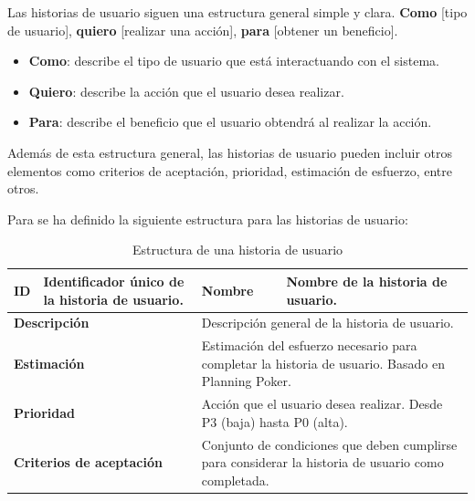Las historias de usuario siguen una estructura general simple y clara. 
\newline\newline
\textbf{Como} [tipo de usuario], \textbf{quiero} [realizar una acción], \textbf{para} [obtener un beneficio].

\begin{itemize}
    \item \textbf{Como}: describe el tipo de usuario que está interactuando con el sistema.
    \item \textbf{Quiero}: describe la acción que el usuario desea realizar.
    \item \textbf{Para}: describe el beneficio que el usuario obtendrá al realizar la acción.   
\end{itemize}

Además de esta estructura general, las historias de usuario pueden incluir otros elementos como criterios de aceptación,
prioridad, estimación de esfuerzo, entre otros.

Para se ha definido la siguiente estructura para las historias de usuario:

\begin{table}[H]
    \centering
    \begin{tabular}{|p{2cm}|p{4cm}|p{2cm}|p{4cm}|}
        \hline
        \textbf{ID} & Identificador único de la historia de usuario. & \textbf{Nombre} & Nombre de la historia de usuario. \\
        \hline
        \multicolumn{2}{|p{6cm}|}{\textbf{Descripción}} & \multicolumn{2}{p{6cm}|}{Descripción general de la historia de usuario.} \\
        \hline
        \multicolumn{2}{|p{6cm}|}{\textbf{Estimación}} & \multicolumn{2}{p{6cm}|}{Estimación del esfuerzo necesario para completar la historia de usuario. Basado en Planning Poker.} \\
        \hline
        \multicolumn{2}{|p{6cm}|}{\textbf{Prioridad}} & \multicolumn{2}{p{6cm}|}{Acción que el usuario desea realizar. Desde P3 (baja) hasta P0 (alta).} \\
        \hline
        \multicolumn{2}{|p{6cm}|}{\textbf{Criterios de aceptación}} & \multicolumn{2}{p{6cm}|}{Conjunto de condiciones que deben cumplirse para considerar la historia de usuario como completada.} \\
        \hline
    \end{tabular}
    \caption{Estructura de una historia de usuario}
    \label{tab:estructura_historia_usuario}
\end{table}


